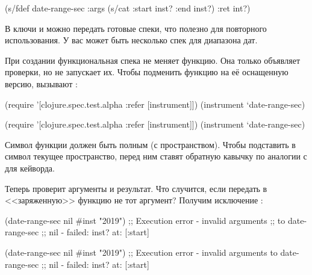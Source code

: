 
\begin{clojure}
(s/fdef date-range-sec
  :args (s/cat :start inst? :end inst?)
  :ret int?)
\end{clojure}

В ключи  и  можно передать готовые спеки, что полезно
для повторного использования. У вас может быть несколько спек для диапазона дат.

При создании функциональная спека не меняет функцию. Она только объявляет
проверки, но не запускает их. Чтобы подменить функцию на её оснащенную версию,
вызывают :

\ifnarrow

\begin{clojure}
(require '[clojure.spec.test.alpha
           :refer [instrument]])
(instrument `date-range-sec)
\end{clojure}

\else

\begin{clojure}
(require '[clojure.spec.test.alpha :refer [instrument]])
(instrument `date-range-sec)
\end{clojure}

\fi


Символ функции должен быть полным (с пространством). Чтобы подставить в символ
текущее пространство, перед ним ставят обратную кавычку  по аналогии с
\code{::} для кейворда.

Теперь  проверит аргументы и результат. Что случится,
если передать в <<заряженную>> функцию не тот аргумент? Получим исключение
:

\ifnarrow

\begin{clojure}
(date-range-sec nil #inst "2019")
;; Execution error - invalid arguments
;; to date-range-sec
;; nil - failed: inst? at: [:start]
\end{clojure}

\else

\begin{clojure}
(date-range-sec nil #inst "2019")
;; Execution error - invalid arguments to date-range-sec
;; nil - failed: inst? at: [:start]
\end{clojure}

\fi


